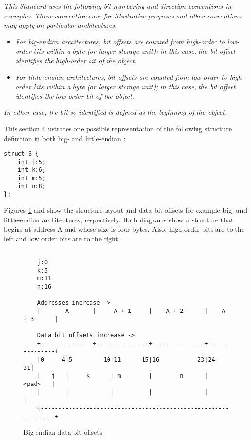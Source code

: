 \textit{This Standard uses the following bit numbering and direction
conventions in examples. These conventions are for illustrative
purposes and other conventions may apply on particular
architectures.}
\begin{itemize}
\item \textit{For big-endian architectures, bit offsets are
counted from high-order to low-order bits within a byte (or
larger storage unit); in this case, the bit offset identifies
the high-order bit of the object.}

\item \textit{For little-endian architectures, bit offsets are
counted from low-order to high-order bits within a byte (or
larger storage unit); in this case, the bit offset identifies
the low-order bit of the object.}
\end{itemize}

\textit{In either case, the bit so identified is defined as the 
beginning of the object.}

This section illustrates one possible representation of the 
following  structure definition in both big- 
and little-endian :

\begin{lstlisting}
struct S {
    int j:5;
    int k:6;
    int m:5;
    int n:8;
};
\end{lstlisting}

Figures \ref{fig:bigendiandatabitoffsets} and
show the structure layout
and data bit offsets for example big- and little-endian
architectures, respectively. Both diagrams show a structure
that begins at address A and whose size is four bytes. Also,
high order bits are to the left and low order bits are to
the right.

\begin{figure}[ht]
\begin{dwflisting}
\begin{verbatim}

    j:0
    k:5
    m:11
    n:16

    Addresses increase ->
    |       A       |     A + 1     |    A + 2      |    A + 3      | 

    Data bit offsets increase ->
    +---------------+---------------+---------------+---------------+
    |0     4|5         10|11      15|16           23|24           31|
    |   j   |     k      | m        |        n      |       <pad>   |
    |       |            |          |               |               | 
    +---------------------------------------------------------------+ 

\end{verbatim}
\end{dwflisting}
\caption{Big-endian data bit offsets}
\label{fig:bigendiandatabitoffsets}
\end{figure}

